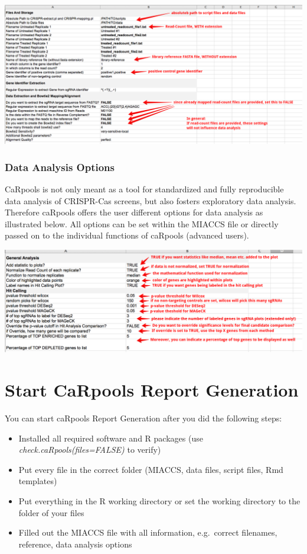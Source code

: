 \documentclass[]{article}
\providecommand{\tightlist}{%
  \setlength{\itemsep}{0pt}\setlength{\parskip}{0pt}}
\begin{document}
\includegraphics{./pictures/miaccs-readcount.png}

\subsubsection{Data Analysis Options}\label{data-analysis-options}

CaRpools is not only meant as a tool for standardized and fully
reproducible data analysis of CRISPR-Cas screens, but also fosters
exploratory data analysis.\\
Therefore caRpools offers the user different options for data analysis
as illustrated below. All options can be set within the MIACCS file or
directly passed on to the individual functions of caRpools (advanced
users).

\includegraphics{./pictures/miaccs-analysis.png}

\section{Start CaRpools Report
Generation}\label{start-carpools-report-generation}

You can start caRpools Report Generation after you did the following
steps:

\begin{itemize}
\tightlist
\item
  Installed all required software and R packages (use
  \emph{check.caRpools(files=FALSE)} to verify)
\item
  Put every file in the correct folder (MIACCS, data files, script
  files, Rmd templates)
\item
  Put everything in the R working directory or set the working directory
  to the folder of your files
\item
  Filled out the MIACCS file with all information, e.g.~correct
  filenames, reference, data analysis options
\end{itemize}
\end{document}
